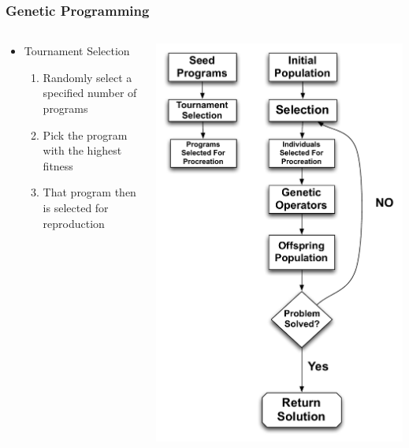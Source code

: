 \documentclass{beamer}
\begin{document}
\begin{frame}
	\frametitle{Genetic Programming}

\begin{columns}[T]

\begin{column}{0.5\textwidth}

\begin{itemize}
	\item Tournament Selection
	\\
	\begin{enumerate}
	\item Randomly select a specified number of programs
	\item Pick the program with the highest fitness
	\item That program then is selected for reproduction
	\end{enumerate}

	
\end{itemize}
\end{column}
\begin{column}{0.5\textwidth}
   \includegraphics[height=0.85\textheight]{Illustrations/GP2.pdf}
       \\
\end{column}
\end{columns}


\end{frame}
\end{document}
